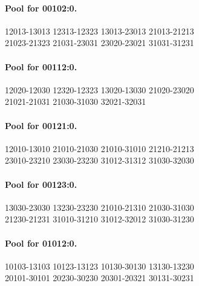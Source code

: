 \documentclass[11pt]{article}
\theoremstyle{remark}
\numberwithin{equation}{section}
\begin{document}
\paragraph{Pool for 00102:0.}
\begingroup\footnotesize\ttfamily\begin{flushleft}
12013-13013 12313-12323 13013-23013 21013-21213\\
21023-21323 21031-23031 23020-23021 31031-31231\\
\end{flushleft}\endgroup
\paragraph{Pool for 00112:0.}
\begingroup\footnotesize\ttfamily\begin{flushleft}
12020-12030 12320-12323 13020-13030 21020-23020\\
21021-21031 21030-31030 32021-32031\\
\end{flushleft}\endgroup
\paragraph{Pool for 00121:0.}
\begingroup\footnotesize\ttfamily\begin{flushleft}
12010-13010 21010-21030 21010-31010 21210-21213\\
23010-23210 23030-23230 31012-31312 31030-32030\\
\end{flushleft}\endgroup
\paragraph{Pool for 00123:0.}
\begingroup\footnotesize\ttfamily\begin{flushleft}
13030-23030 13230-23230 21010-21310 21030-31030\\
21230-21231 31010-31210 31012-32012 31030-31230\\
\end{flushleft}\endgroup
\paragraph{Pool for 01012:0.}
\begingroup\footnotesize\ttfamily\begin{flushleft}
10103-13103 10123-13123 10130-30130 13130-13230\\
20101-30101 20230-30230 20301-20321 30131-30231\\
\end{flushleft}\endgroup
\end{document}
